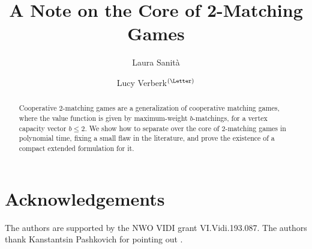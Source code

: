 \documentclass[a4paper]{article}
\begin{document}
\title{A Note on the Core of 2-Matching Games}
\author[1]{Laura Sanità}
\author[2]{Lucy Verberk\(^{(\text{\Letter})}\)}
\date{}
\maketitle


\begin{abstract}
    Cooperative \(2\)-matching games are a generalization of cooperative matching games, where the value function is given by maximum-weight \(b\)-matchings, for a vertex capacity vector \(b \leq 2\). We show how to separate over the core of \(2\)-matching games in polynomial time, fixing a small flaw in the literature, and prove the existence of a compact extended formulation for it.

\end{abstract}







\section{Acknowledgements}
    The authors are supported by the NWO VIDI grant VI.Vidi.193.087.
    The authors thank Kanstantsin Pashkovich for pointing out \cite{Barahona1993Reducing}.




\end{document}
